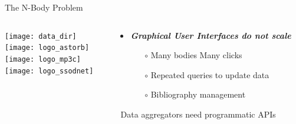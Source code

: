 \begin{frame}[t]{The N-Body Problem}

\begin{columns}[T]

      \begin{column}{.3\textwidth}
        \vspace{0.5em}\texttt{[image: data\_dir]}\\
        \vspace{0.5em}\texttt{[image: logo\_astorb]}\\
        \vspace{0.5em}\texttt{[image: logo\_mp3c]}\\
        \vspace{0.5em}\texttt{[image: logo\_ssodnet]}\\
      \end{column}

    \begin{column}{.7\textwidth}
      \begin{overlayarea}{\textwidth}{\textheight}

        \begin{itemize}[<.->]
          \item \emph{\bf Graphical User Interfaces do not scale}
            \begin{itemize}[<.->]
              \item[$\circ$] Many bodies \textrightarrow Many clicks
              \item[$\circ$] Repeated queries to update data
              \item[$\circ$] Bibliography management
            \end{itemize}
        \end{itemize}
          \textrightarrow~Data aggregators need programmatic APIs


\end{overlayarea}
\end{column}
\end{columns}
\end{frame}
